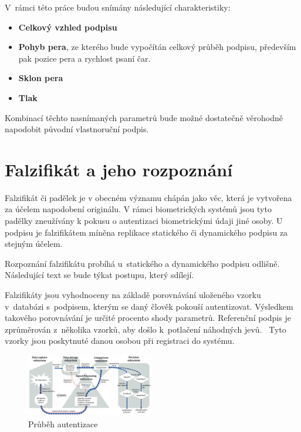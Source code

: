 V~rámci této práce budou snímány následující charakteristiky:
\begin{itemize}
  \item \textbf{Celkový vzhled podpisu}
  \item \textbf{Pohyb pera}, ze kterého bude vypočítán celkový průběh podpisu, především pak pozice pera a rychlost psaní čar. 
  \item \textbf{Sklon pera} 
  \item \textbf{Tlak}
\end{itemize}
Kombinací těchto nasnímaných parametrů bude možné dostatečně věrohodně napodobit původní vlastnoruční podpis. 

\section{Falzifikát a jeho rozpoznání}
Falzifikát či padělek je v obecném významu chápán jako věc, která je vytvořena za účelem napodobení originálu.    %
V rámci biometrických systémů jsou tyto padělky zneužívány k pokusu o autentizaci biometrickými údaji jiné osoby. %
U podpisu je falzifikátem míněna replikace statického či dynamického podpisu za stejným účelem.                   %

Rozpoznání falzifikátu probíhá u~statického a dynamického podpisu odlišně. 
Následující text se bude týkat postupu, který sdílejí.

Falzifikáty jsou vyhodnoceny na základě porovnávání uloženého vzorku v~databázi s~podpisem, kterým se daný člověk pokouší autentizovat.
Výsledkem takového porovnávání je určité procento shody parametrů.
Referenční podpis je zprůměrován z~několika vzorků, aby došlo k~potlačení náhodných jevů.~\cite{VUT2009} %
Tyto vzorky jsou poskytnuté danou osobou při registraci do systému.

\begin{figure}[h]
  \centering
  \includegraphics[width=0.5\textwidth]{obrazky-figures/proces_autentizace.png}
  \caption{Průběh autentizace~\cite{ISOIEC19795-1_2021}}
  \label{fig:proces_autentizace} %
\end{figure}

